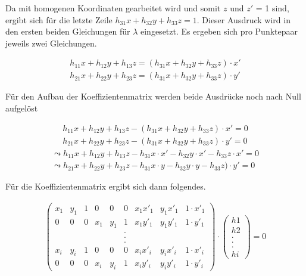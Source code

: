 Da mit homogenen Koordinaten gearbeitet wird und somit $z$ und $z'$ = 1 sind, ergibt sich für die letzte Zeile $h_{31}x+h_{32}y+h_{33}z= 1$. Dieser Ausdruck wird in den ersten beiden Gleichungen für $\lambda$ eingesetzt. Es ergeben sich pro Punktepaar jeweils zwei Gleichungen. 

\begin{gather}
	h_{11}x+h_{12}y+h_{13}z= (h_{31}x+h_{32}y+h_{33}z) \cdot x'\\
		h_{21}x+h_{22}y+h_{23}z= (h_{31}x+h_{32}y+h_{33}z) \cdot y'
\end{gather}

Für den Aufbau der Koeffizientenmatrix werden beide Ausdrücke noch nach Null aufgelöst

\begin{gather}
	h_{11}x+h_{12}y+h_{13}z -(h_{31}x+h_{32}y+h_{33}z) \cdot x'= 0 \\	h_{21}x+h_{22}y+h_{23}z-(h_{31}x+h_{32}y+h_{33}z) \cdot y'=0
	\end{gather}
\begin{gather}
	\leadsto h_{11}x+h_{12}y+h_{13}z -h_{31}x\cdot x' - h_{32}y \cdot x'-h_{33}z\cdot x'= 0\\
	\leadsto h_{21}x+h_{22}y+h_{23}z-h_{31}x\cdot y -h_{32}y \cdot y -h_{33}z) \cdot y'=0
\end{gather}

Für die Koeffizientenmatrix ergibt sich dann folgendes.

\begin{gather}
	\begin{pmatrix}
	x_1&y_1&1&0&0&0&x_1 x'_1&y_1 x'_1 & 1\cdot x'_1\\
	0&0&0&x_1&y_1&1&x_1 y'_1&y_1 y'_1 & 1\cdot y'_1\\
	&&&&&.&&&\\	
	&&&&&.&&&\\	
	&&&&&.&&&\\	
	x_i&y_i&1&0&0&0&x_i x'_i&y_i x'_i & 1\cdot x'_i\\
	0&0&0&x_i&y_i&1&x_i y'_i&y_i y'_i & 1\cdot y'_i
	\end{pmatrix}
	\cdot
	\begin{pmatrix}
	h1\\h2\\.\\.\\.\\hi
	\end{pmatrix}
	=0
\end{gather}


